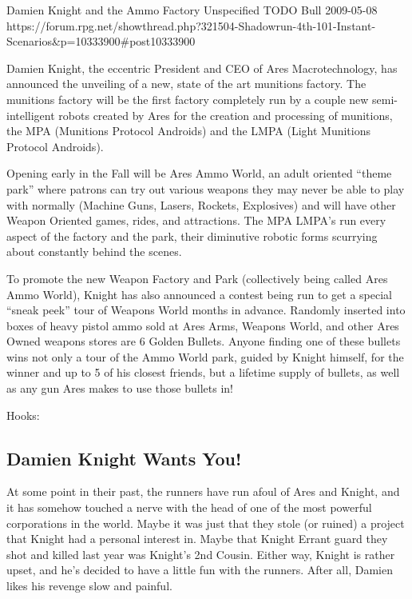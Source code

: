 \begin{scenario}{Damien Knight and the Ammo Factory}
	{Unspecified}
	{TODO}
	{Bull}
	{2009-05-08}
	{https://forum.rpg.net/showthread.php?321504-Shadowrun-4th-101-Instant-Scenarios\&p=10333900#post10333900}

Damien Knight, the eccentric President and CEO of Ares Macrotechnology, has announced the unveiling of a new, state of the art munitions factory. The munitions factory will be the first factory completely run by a couple new semi-intelligent robots created by Ares for the creation and processing of munitions, the MPA (Munitions Protocol Androids) and the LMPA (Light Munitions Protocol Androids).

Opening early in the Fall will be Ares Ammo World, an adult oriented ``theme park'' where patrons can try out various weapons they may never be able to play with normally (Machine Guns, Lasers, Rockets, Explosives) and will have other Weapon Oriented games, rides, and attractions. The MPA LMPA's run every aspect of the factory and the park, their diminutive robotic forms scurrying about constantly behind the scenes.

To promote the new Weapon Factory and Park (collectively being called Ares Ammo World), Knight has also announced a contest being run to get a special ``sneak peek'' tour of Weapons World months in advance. Randomly inserted into boxes of heavy pistol ammo sold at Ares Arms, Weapons World, and other Ares Owned weapons stores are 6 Golden Bullets. Anyone finding one of these bullets wins not only a tour of the Ammo World park, guided by Knight himself, for the winner and up to 5 of his closest friends, but a lifetime supply of bullets, as well as any gun Ares makes to use those bullets in!

Hooks:

\subsection{Damien Knight Wants You!}

At some point in their past, the runners have run afoul of Ares and Knight, and it has somehow touched a nerve with the head of one of the most powerful corporations in the world. Maybe it was just that they stole (or ruined) a project that Knight had a personal interest in. Maybe that Knight Errant guard they shot and killed last year was Knight's 2nd Cousin. Either way, Knight is rather upset, and he's decided to have a little fun with the runners. After all, Damien likes his revenge slow and painful.


\end{scenario}
